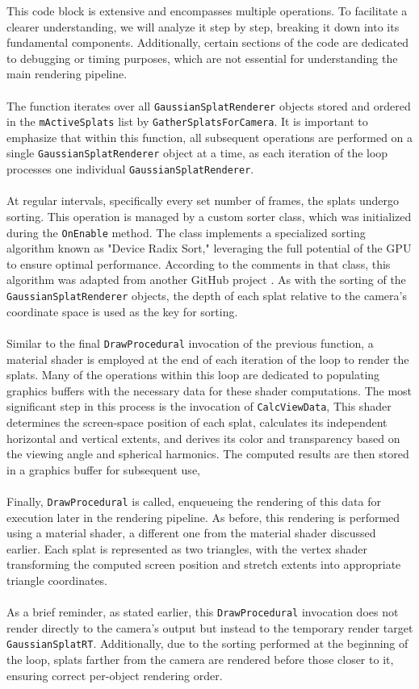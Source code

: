 \documentclass[12pt]{article}
\begin{document}
This code block is extensive and encompasses multiple operations. To facilitate a clearer understanding, we will analyze it step by step, breaking it down into its fundamental components. Additionally, certain sections of the code are dedicated to debugging or timing purposes, which are not essential for understanding the main rendering pipeline.\\\\
The function iterates over all \texttt{GaussianSplatRenderer} objects stored and ordered in the \texttt{m\textunderscore ActiveSplats} list by \texttt{GatherSplatsForCamera}. It is important to emphasize that within this function, all subsequent operations are performed on a single \texttt{GaussianSplatRenderer} object at a time, as each iteration of the loop processes one individual \texttt{GaussianSplatRenderer}.\\\\
At regular intervals, specifically every set number of frames, the splats undergo sorting. This operation is managed by a custom sorter class, which was initialized during the \texttt{OnEnable} method. The class implements a specialized sorting algorithm known as "Device Radix Sort," leveraging the full potential of the GPU to ensure optimal performance. According to the comments in that class, this algorithm was adapted from another GitHub project \parencite{Sorting}. As with the sorting of the \texttt{GaussianSplatRenderer} objects, the depth of each splat relative to the camera’s coordinate space is used as the key for sorting.
\\\\
Similar to the final \texttt{DrawProcedural} invocation of the previous function, a material shader is employed at the end of each iteration of the loop to render the splats. Many of the operations within this loop are dedicated to populating graphics buffers with the necessary data for these shader computations. The most significant step in this process is the invocation of \texttt{CalcViewData}, This shader determines the screen-space position of each splat, calculates its independent horizontal and vertical extents, and derives its color and transparency based on the viewing angle and spherical harmonics. The computed results are then stored in a graphics buffer for subsequent use, \\\\
Finally, \texttt{DrawProcedural} is called, enqueueing the rendering of this data for execution later in the rendering pipeline. As before, this rendering is performed using a material shader, a different one from the material shader discussed earlier. Each splat is represented as two triangles, with the vertex shader transforming the computed screen position and stretch extents into appropriate triangle coordinates.
\\\\
As a brief reminder, as stated earlier, this \texttt{DrawProcedural} invocation does not render directly to the camera’s output but instead to the temporary render target \texttt{GaussianSplatRT}. Additionally, due to the sorting performed at the beginning of the loop, splats farther from the camera are rendered before those closer to it, ensuring correct per-object rendering order.
\end{document}

